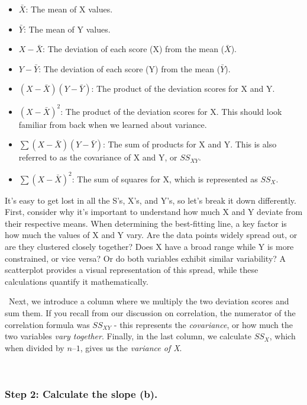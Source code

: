 \documentclass[
  letterpaper,
  DIV=11,
  numbers=noendperiod]{scrreprt}
\begin{document}
\begin{itemize}
\item
  \(\bar{X}\): The mean of X values.\,
\item
  \(\bar{Y}\): The mean of Y values.
\item
  \(X - \bar{X}\): The deviation of each score (X) from the mean
  (\(\bar{X}\)).\,
\item
  \(Y − \bar{Y}\): The deviation of each score (Y) from the mean
  (\(\bar{Y}\)).\,
\item
  \((X − \bar{X})(Y − \bar{Y})\): The product of the deviation scores
  for X and Y.\,\,
\item
  \((X − \bar{X})^2\): The product of the deviation scores for X. This
  should look familiar from back when we learned about variance.\,\,
\item
  \(\sum(X − \bar{X})(Y − \bar{Y})\): The sum of products for X and Y.
  This is also referred to as the covariance of X and Y, or
  \(SS_{XY}\).\,\,
\item
  \(\sum(X − \bar{X})^2\): The sum of squares for X, which is
  represented as \(SS_X\).\,
\end{itemize}

It's easy to get lost in all the S's, X's, and Y's, so let's break it
down differently. First, consider why it's important to understand how
much X and Y deviate from their respective means. When determining the
best-fitting line, a key factor is how much the values of X and Y vary.
Are the data points widely spread out, or are they clustered closely
together? Does X have a broad range while Y is more constrained, or vice
versa? Or do both variables exhibit similar variability? A scatterplot
provides a visual representation of this spread, while these
calculations quantify it mathematically.

\, Next, we introduce a column where we multiply the two deviation
scores and sum them. If you recall from our discussion on correlation,
the numerator of the correlation formula was \(SS_{XY}\) - this
represents the \emph{covariance}, or how much the two variables
\emph{vary together}. Finally, in the last column, we calculate
\(SS_X\), which when divided by \(n – 1\), gives us the \emph{variance
of X}.\,\,\,

\,

\subsubsection*{Step 2: Calculate the slope
(b).\,}\label{step-2-calculate-the-slope-b.}
\end{document}
